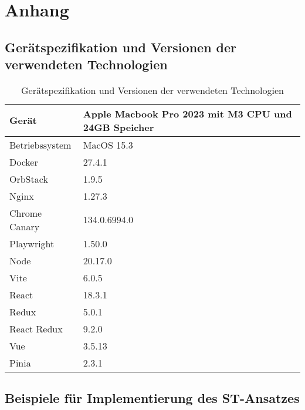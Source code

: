 %

\chapter{Anhang}

\section{Gerätspezifikation und Versionen der verwendeten Technologien}

\begin{table}[h!]
  \caption{Gerätspezifikation und Versionen der verwendeten Technologien}
  \label{tab:specsAndVersions}
  
  \begin{center}
    \begin{tabular}{ | m{5cm}| m{5cm} | } 
      \hline
      Gerät & Apple Macbook Pro 2023 mit M3 CPU und 24GB Speicher \\ 
      \hline
      Betriebssystem & MacOS 15.3 \\ 
      \hline
      Docker & 27.4.1 \\ 
      \hline
      OrbStack & 1.9.5 \\ 
      \hline
      Nginx & 1.27.3 \\ 
      \hline
      Chrome Canary & 134.0.6994.0 \\ 
      \hline
      Playwright & 1.50.0 \\ 
      \hline
      Node & 20.17.0 \\ 
      \hline
      Vite & 6.0.5 \\ 
      \hline
      React & 18.3.1 \\ 
      \hline
      Redux & 5.0.1 \\ 
      \hline
      React Redux & 9.2.0 \\ 
      \hline
      Vue & 3.5.13 \\ 
      \hline
      Pinia & 2.3.1 \\ 
      \hline
    \end{tabular}
  \end{center}
\end{table}

\section{Beispiele für Implementierung des ST-Ansatzes}


